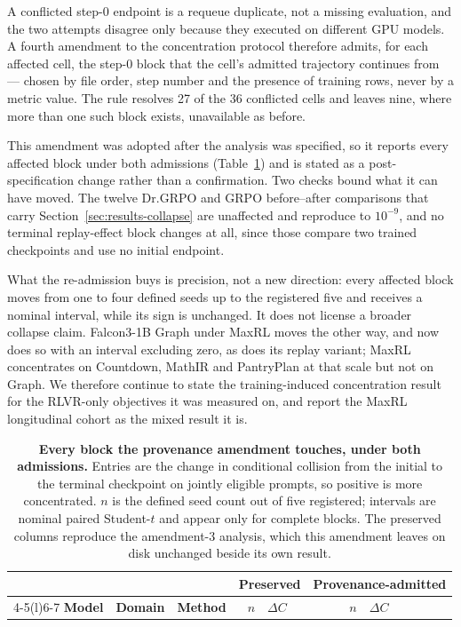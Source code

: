 \documentclass{article}
\newcommand{\1}{\mathbf 1}
\theoremstyle{remark}
\theoremstyle{definition}
\theoremstyle{plain}
\begin{document}
A conflicted step-0 endpoint is a requeue duplicate, not a missing evaluation,
and the two attempts disagree only because they executed on different GPU
models. A fourth amendment to the concentration protocol therefore admits, for
each affected cell, the step-0 block that the cell's admitted trajectory
continues from --- chosen by file order, step number and the presence of
training rows, never by a metric value. The rule resolves 27 of the 36
conflicted cells and leaves nine, where more than one such block exists,
unavailable as before.

This amendment was adopted after the analysis was specified, so it reports
every affected block under both admissions (Table~\ref{tab:initial-provenance}) and is stated as a
post-specification change rather than a confirmation. Two checks bound what it
can have moved. The twelve Dr.GRPO and GRPO before--after comparisons that
carry Section~\ref{sec:results-collapse} are unaffected and reproduce to
$10^{-9}$, and no terminal replay-effect block changes at all, since those
compare two trained checkpoints and use no initial endpoint.

What the re-admission buys is precision, not a new direction: every affected
block moves from one to four defined seeds up to the registered five and
receives a nominal interval, while its sign is unchanged. It does not license a
broader collapse claim. Falcon3-1B Graph under MaxRL moves the other way, and
now does so with an interval excluding zero, as does its replay variant; MaxRL
concentrates on Countdown, MathIR and PantryPlan at that scale but not on
Graph. We therefore continue to state the training-induced concentration result
for the RLVR-only objectives it was measured on, and report the MaxRL
longitudinal cohort as the mixed result it is.

\begin{table}[H]
  \centering
  \caption{\textbf{Every block the provenance amendment touches, under both
  admissions.} Entries are the change in conditional collision from the initial
  to the terminal checkpoint on jointly eligible prompts, so positive is more
  concentrated. $n$ is the defined seed count out of five registered; intervals
  are nominal paired Student-$t$ and appear only for complete blocks. The
  preserved columns reproduce the amendment-3 analysis, which this amendment
  leaves on disk unchanged beside its own result.}
  \label{tab:initial-provenance}
  \small
  \setlength{\tabcolsep}{4pt}
  \begin{tabular}{@{}lll rl rl@{}}
    \toprule
    & & & \multicolumn{2}{c}{\textbf{Preserved}} & \multicolumn{2}{c}{\textbf{Provenance-admitted}} \\
    \cmidrule(lr){4-5}\cmidrule(l){6-7}
    \textbf{Model} & \textbf{Domain} & \textbf{Method} &
      $n$ & $\Delta C$ & $n$ & $\Delta C$ \\
    \midrule
    
  \end{tabular}
\end{table}
\end{document}
